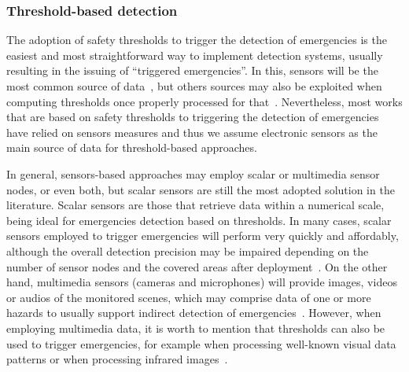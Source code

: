 \begin{refsection}
\subsubsection{Threshold-based detection}

The adoption of safety thresholds to trigger the detection of emergencies is the easiest and most straightforward way to implement detection systems, usually resulting in the issuing of ``triggered emergencies''. In this, sensors will be the most common source of data~\cite{smartcities1,sensorsplatforms}, but others sources may also be exploited when computing thresholds once properly processed for that~\cite{thresholdmedia1}. Nevertheless, most works that are based on safety thresholds to triggering the detection of emergencies have relied on sensors measures and thus we assume electronic sensors as the main source of data for threshold-based approaches.

In general, sensors-based approaches may employ scalar or multimedia sensor nodes, or even both, but scalar sensors are still the most adopted solution in the literature. Scalar sensors are those that retrieve data within a numerical scale, being ideal for emergencies detection based on thresholds. In many cases, scalar sensors employed to trigger emergencies will perform very quickly and affordably, although the overall detection precision may be impaired depending on the number of sensor nodes and the covered areas after deployment~\cite{smartcities3,sensorsprecision1}. On the other hand, multimedia sensors (cameras and microphones) will provide images, videos or audios of the monitored scenes, which may comprise data of one or more hazards to usually support indirect detection of emergencies~\cite{emergenciesmetric3,emergenciesmetric6}. However, when employing multimedia data, it is worth to mention that thresholds can also be used to trigger emergencies, for example when processing well-known visual data patterns or when processing infrared images~\cite{cameraThreshold1,cameraThreshold2}.


\end{refsection}
